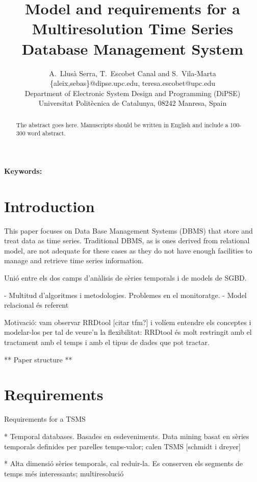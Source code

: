 \documentclass{scrartcl}
\title{
  Model and requirements 
  for a Multiresolution Time Series\\
  Database Management System }
\author
{
  {
    A.\ Llusà Serra,
    T.\ Escobet Canal
    and S.\ Vila-Marta
  }\\
  {\{aleix,sebas\}@dipse.upc.edu, teresa.escobet@upc.edu}\\
  {Department of Electronic System Design and Programming (DiPSE)}\\
  {Universitat Politècnica de Catalunya, 08242 Manresa, Spain}
}
\begin{document}
\maketitle


\begin{abstract}
The abstract goes here.
Manuscripts should be written in English and include a 100-300 word abstract.
\end{abstract}

{\bfseries Keywords:} 



\twocolumn



\section{Introduction}

This paper focuses on Data Base Management Systems (DBMS) that store
and treat data as time series. Traditional DBMS, as is ones derived
from relational model, are not adequate for these cases as they do not
have enough facilities to manage and retrieve time series
information.



Unió entre els dos camps d'anàlisis de sèries temporals i de models de SGBD. 

- Multitud d'algoritmes i metodologies. Problemes en el monitoratge.
- Model relacional és referent




Motivació: vam observar RRDtool [citar tfm?] i volíem entendre els conceptes i modelar-los per tal de veure'n la flexibilitat: RRDtool és molt restringit amb el tractament amb el temps i amb el tipus de dades que pot tractar.



** Paper structure **



\section{Requirements}

Requirements for a TSMS


* Temporal databases. Basades en esdeveniments. Data mining basat en sèries temporals definides per parelles temps-valor; calen TSMS [schmidt i dreyer] 

* Alta dimensió sèries temporals, cal reduir-la. Es conserven els segments de temps més interessants; multiresolució
\end{document}
